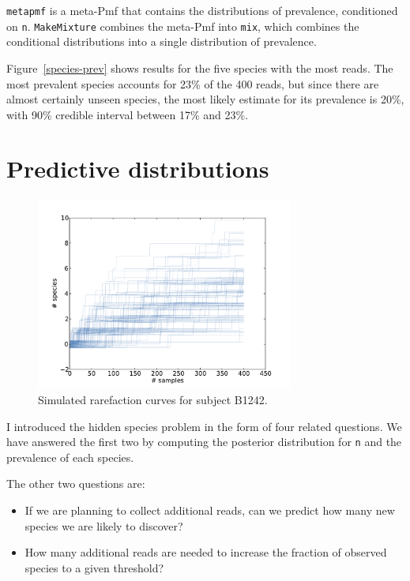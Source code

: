 \documentclass[12pt]{book}
\begin{document}
{\tt metapmf} is a meta-Pmf that contains the distributions
of prevalence, conditioned on {\tt n}.  {\tt MakeMixture}
combines the meta-Pmf into {\tt mix}, which combines the
conditional distributions into a single distribution
of prevalence.

Figure~\ref{species-prev} shows results for the five
species with the most reads.  The most prevalent species accounts for
23\% of the 400 reads, but since there are almost certainly unseen
species, the most likely estimate for its prevalence is 20\%,
with 90\% credible interval between 17\% and 23\%.


\section{Predictive distributions}

\begin{figure}
\centerline{\includegraphics[height=2.5in]{figs/species-rare-B1242.pdf}}
\caption{Simulated rarefaction curves for subject B1242.}
\label{species-rare}
\end{figure}

I introduced the hidden species problem in the form of four related
questions.  We have answered the first two by computing the posterior
distribution for {\tt n} and the prevalence of each species.

The other two questions are:

\begin{itemize}

\item If we are planning to collect additional reads, can we predict
  how many new species we are likely to discover?

\item How many additional reads are needed to increase the
  fraction of observed species to a given threshold?

\end{itemize}
\end{document}
